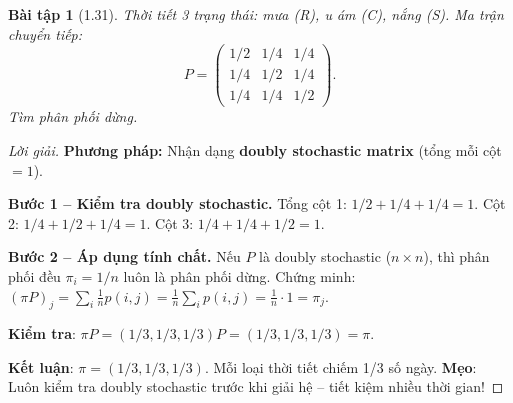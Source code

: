 \documentclass[8pt,a4paper]{article}
\newtheorem{exercise}{Bài tập}
\newenvironment{solution}{\begin{proof}[Lời giải]}{\end{proof}}
\begin{document}
\begin{exercise}[1.31]
Thời tiết 3 trạng thái: mưa (R), u ám (C), nắng (S). Ma trận chuyển tiếp:
\[
  P = \begin{pmatrix} 1/2 & 1/4 & 1/4 \\ 1/4 & 1/2 & 1/4 \\ 1/4 & 1/4 & 1/2 \end{pmatrix}.
\]
Tìm phân phối dừng.
\end{exercise}
\begin{solution}
\textbf{Phương pháp:} Nhận dạng \textbf{doubly stochastic matrix} (tổng mỗi cột $= 1$).

\textbf{Bước 1 -- Kiểm tra doubly stochastic.}
Tổng cột 1: $1/2 + 1/4 + 1/4 = 1$. Cột 2: $1/4 + 1/2 + 1/4 = 1$. Cột 3: $1/4 + 1/4 + 1/2 = 1$. \checkmark

\textbf{Bước 2 -- Áp dụng tính chất.}
Nếu $P$ là doubly stochastic ($n\times n$), thì phân phối đều $\pi_i = 1/n$ luôn là phân phối dừng. Chứng minh: $(\pi P)_j = \sum_i \frac{1}{n} p(i,j) = \frac{1}{n} \sum_i p(i,j) = \frac{1}{n} \cdot 1 = \pi_j$.

\textbf{Kiểm tra}: $\pi P = (1/3, 1/3, 1/3) P = (1/3, 1/3, 1/3) = \pi$. \checkmark

\textbf{Kết luận}: $\pi = (1/3, 1/3, 1/3)$. Mỗi loại thời tiết chiếm 1/3 số ngày. \textbf{Mẹo}: Luôn kiểm tra doubly stochastic trước khi giải hệ -- tiết kiệm nhiều thời gian!
\end{solution}
\end{document}
